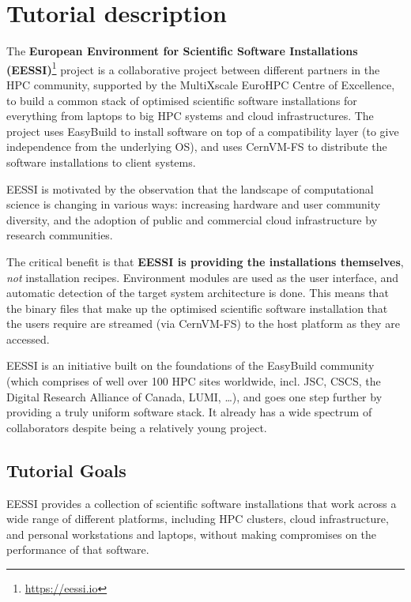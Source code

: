 \section*{Tutorial description}

The \textbf{European Environment for Scientific Software Installations
(EESSI)}\footnote{\href{https://eessi.io}{https://eessi.io}} project is a collaborative project
between different partners in the HPC community, supported by the \mbox{MultiXscale} EuroHPC Centre of Excellence, to build a
common stack of optimised scientific software installations for everything from laptops to big HPC systems and cloud
infrastructures.
The project uses EasyBuild to install software on top of a compatibility layer (to give independence from the underlying
OS), and uses CernVM-FS to
distribute the software installations to client systems.

EESSI is motivated by the observation that the landscape of computational science is changing in
various ways: increasing hardware and user community diversity, and the adoption of public and commercial cloud
infrastructure by research communities.

The critical benefit is that \textbf{EESSI is providing the
installations themselves}, \textit{not} installation recipes.
Environment modules are used as the user interface, and automatic
detection of the target system architecture is done.
This means that the binary files that make up the optimised
scientific software installation that the users require are streamed (via CernVM-FS) to the host
platform as they are accessed.

EESSI is an initiative built on the foundations of the EasyBuild community (which comprises of well over
100 HPC sites worldwide, incl. JSC, CSCS, the Digital Research Alliance of Canada, LUMI, \ldots), and goes one
step further by providing a truly uniform software stack.
It already has a wide spectrum of collaborators despite being a relatively young project.

\subsection*{Tutorial Goals}

EESSI provides a collection of scientific software installations that work across a wide range of
different platforms, including HPC clusters, cloud infrastructure, and personal workstations and laptops, without making
compromises on the performance of that software.

